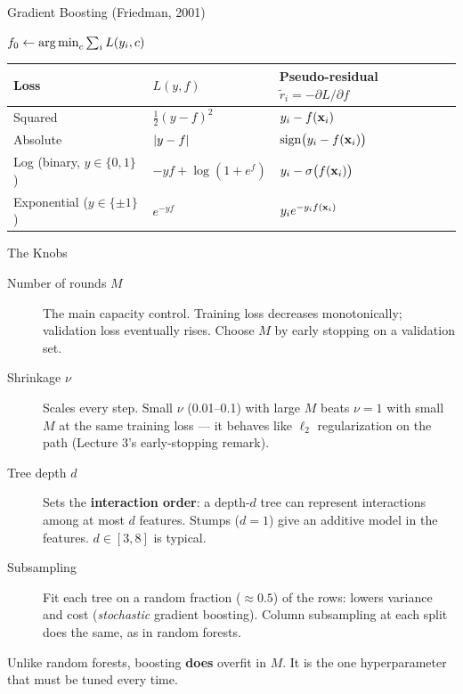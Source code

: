 \documentclass[11pt,aspectratio=169]{beamer}
\begin{document}
\begin{frame}{Gradient Boosting (Friedman, 2001)}\footnotesize
\begin{algorithm}[H]
\SetAlgoLined
\KwIn{data, loss $L$, base class $\Hset_0$, rounds $M$, shrinkage $\nu\in(0,1]$}
$f_0\gets\operatorname*{arg\,min}_c\sum_iL(y_i,c)$ 
\end{algorithm}
\begin{center}
\begin{tabular}{lll}
\toprule
Loss & $L(y,f)$ & Pseudo-residual $\tilde r_i=-\partial L/\partial f$ \\
\midrule
Squared & $\tfrac12(y-f)^2$ & $y_i-f(\mathbf{x}_i)$ \\
Absolute & $\left\lvert y-f \right\rvert$ & $\operatorname{sign}\bigl(y_i-f(\mathbf{x}_i)\bigr)$ \\
Log (binary, $y\in\{0,1\}$) & $-y f+\log(1+e^f)$ & $y_i-\sigma\bigl(f(\mathbf{x}_i)\bigr)$ \\
Exponential ($y\in\{\pm1\}$) & $e^{-yf}$ & $y_ie^{-y_if(\mathbf{x}_i)}$ \\
\bottomrule
\end{tabular}
\end{center}
\end{frame}

\begin{frame}{The Knobs}
\begin{description}
  \item[Number of rounds $M$] The main capacity control. Training loss decreases monotonically; validation
        loss eventually rises. Choose $M$ by early stopping on a validation set.
  \item[Shrinkage $\nu$] Scales every step. Small $\nu$ (0.01--0.1) with large $M$ beats $\nu=1$ with small $M$
        at the same training loss --- it behaves like $\ell_2$ regularization on the path (Lecture 3's early-stopping remark).
  \item[Tree depth $d$] Sets the \textbf{interaction order}: a depth-$d$ tree can represent interactions among
        at most $d$ features. Stumps ($d=1$) give an additive model in the features. $d\in[3,8]$ is typical.
  \item[Subsampling] Fit each tree on a random fraction ($\approx0.5$) of the rows: lowers variance and cost
        (\emph{stochastic} gradient boosting). Column subsampling at each split does the same, as in random forests.
\end{description}
\begin{caution}
Unlike random forests, boosting \textbf{does} overfit in $M$. It is the one hyperparameter that must be tuned
every time.
\end{caution}
\end{frame}
\end{document}
